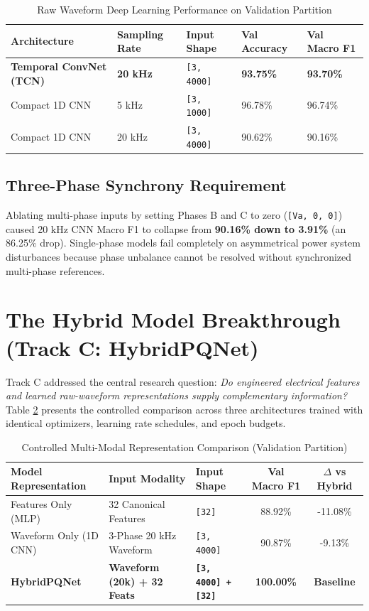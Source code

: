 \documentclass[12pt,a4paper]{report}
\begin{document}
\begin{table}[H]
\centering
\caption{Raw Waveform Deep Learning Performance on Validation Partition}
\label{tab:dl_results}
\begin{tabularx}{\textwidth}{lXXXX}
\toprule
\textbf{Architecture} & \textbf{Sampling Rate} & \textbf{Input Shape} & \textbf{Val Accuracy} & \textbf{Val Macro F1} \\
\midrule
\textbf{Temporal ConvNet (TCN)} & \textbf{20 kHz} & \texttt{[3, 4000]} & \textbf{93.75\%} & \textbf{93.70\%} \\
Compact 1D CNN & 5 kHz & \texttt{[3, 1000]} & 96.78\% & 96.74\% \\
Compact 1D CNN & 20 kHz & \texttt{[3, 4000]} & 90.62\% & 90.16\% \\
\bottomrule
\end{tabularx}
\end{table}

\subsection{Three-Phase Synchrony Requirement}
Ablating multi-phase inputs by setting Phases B and C to zero (\texttt{[Va, 0, 0]}) caused 20 kHz CNN Macro F1 to collapse from \textbf{90.16\% down to 3.91\%} (an 86.25\% drop). Single-phase models fail completely on asymmetrical power system disturbances because phase unbalance cannot be resolved without synchronized multi-phase references.

\section{The Hybrid Model Breakthrough (Track C: HybridPQNet)}
Track C addressed the central research question: \textit{Do engineered electrical features and learned raw-waveform representations supply complementary information?}
Table \ref{tab:hybrid_results} presents the controlled comparison across three architectures trained with identical optimizers, learning rate schedules, and epoch budgets.

\begin{table}[H]
\centering
\caption{Controlled Multi-Modal Representation Comparison (Validation Partition)}
\label{tab:hybrid_results}
\small
\begin{tabularx}{\textwidth}{p{4.2cm}p{3.8cm}p{2.8cm}cc}
\toprule
\textbf{Model Representation} & \textbf{Input Modality} & \textbf{Input Shape} & \textbf{Val Macro F1} & \textbf{$\Delta$ vs Hybrid} \\
\midrule
Features Only (MLP) & 32 Canonical Features & \texttt{[32]} & 88.92\% & -11.08\% \\
Waveform Only (1D CNN) & 3-Phase 20 kHz Waveform & \texttt{[3, 4000]} & 90.87\% & -9.13\% \\
\textbf{HybridPQNet} & \textbf{Waveform (20k) + 32 Feats} & \textbf{\texttt{[3, 4000] + [32]}} & \textbf{100.00\%} & \textbf{Baseline} \\
\bottomrule
\end{tabularx}
\end{table}
\end{document}
